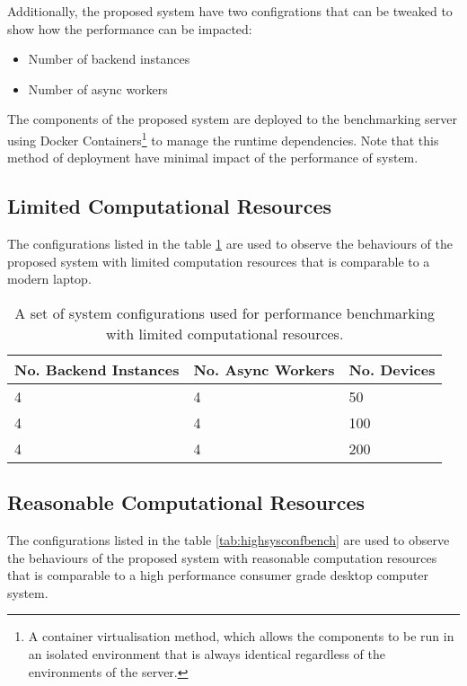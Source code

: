 \documentclass[../thesis.tex]{subfiles}
\begin{document}
Additionally, the proposed system have two configrations that can be tweaked to show how the performance can be impacted:

\begin{itemize}
	\item Number of backend instances
	\item Number of async workers
\end{itemize}

The components of the proposed system are deployed to the benchmarking server using Docker Containers\footnote{A container virtualisation method, which allows the components to be run in an isolated environment that is always identical regardless of the environments of the server.} to manage the runtime dependencies. Note that this method of deployment have minimal impact of the performance of system. 

\subsection{Limited Computational Resources}
The configurations listed in the table \ref{tab:lowsysconfbench} are used to observe the behaviours of the proposed system with limited computation resources that is comparable to a modern laptop.

\begin{table}[h!]
	\begin{center}
		\caption{A set of system configurations used for performance benchmarking with limited computational resources.}
		\label{tab:lowsysconfbench}
		\begin{tabular}{l|l|l}
			\toprule
			\textbf{No. Backend Instances} & \textbf{No. Async Workers} & \textbf{No. Devices}\\
			\midrule
			4 & 4 & 50\\
			4 & 4 & 100\\
			4 & 4 & 200\\
			\bottomrule
		\end{tabular}
	\end{center}
\end{table}

\subsection{Reasonable Computational Resources}

The configurations listed in the table \ref{tab:highsysconfbench} are used to observe the behaviours of the proposed system with reasonable computation resources that is comparable to a high performance consumer grade desktop computer system.
\end{document}
